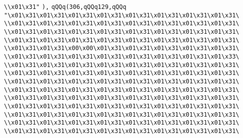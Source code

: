\verb|\\x01\x31"|\newline
\verb|),|\newline
\verb|qQQq(306,qQQq129,qQQq|\newline
\verb|"\x01\x31\x01\x31\x01\x31\x01\x31\x01\x31\x01\x31\x01\x31\x01\x31\|\newline
\verb|\\x01\x31\x01\x31\x01\x31\x01\x31\x01\x31\x01\x31\x01\x31\x01\x31\|\newline
\verb|\\x01\x31\x01\x31\x01\x31\x01\x31\x01\x31\x01\x31\x01\x31\x01\x31\|\newline
\verb|\\x01\x31\x01\x31\x01\x31\x01\x31\x01\x31\x01\x31\x01\x31\x01\x31\|\newline
\verb|\\x01\x31\x01\x31\x00\x00\x01\x31\x01\x31\x01\x31\x01\x31\x01\x31\|\newline
\verb|\\x01\x31\x01\x31\x01\x31\x01\x31\x01\x31\x01\x31\x01\x31\x01\x33\|\newline
\verb|\\x01\x31\x01\x31\x01\x31\x01\x31\x01\x31\x01\x31\x01\x31\x01\x31\|\newline
\verb|\\x01\x31\x01\x31\x01\x31\x01\x31\x01\x31\x01\x31\x01\x31\x01\x31\|\newline
\verb|\\x01\x31\x01\x31\x01\x31\x01\x31\x01\x31\x01\x31\x01\x31\x01\x31\|\newline
\verb|\\x01\x31\x01\x31\x01\x31\x01\x31\x01\x31\x01\x31\x01\x31\x01\x31\|\newline
\verb|\\x01\x31\x01\x31\x01\x31\x01\x31\x01\x31\x01\x31\x01\x31\x01\x31\|\newline
\verb|\\x01\x31\x01\x31\x01\x31\x01\x31\x01\x31\x01\x31\x01\x31\x01\x31\|\newline
\verb|\\x01\x31\x01\x31\x01\x31\x01\x31\x01\x31\x01\x31\x01\x31\x01\x31\|\newline
\verb|\\x01\x31\x01\x31\x01\x31\x01\x31\x01\x31\x01\x31\x01\x31\x01\x31\|\newline
\verb|\\x01\x31\x01\x31\x01\x31\x01\x31\x01\x31\x01\x31\x01\x31\x01\x31\|\newline
